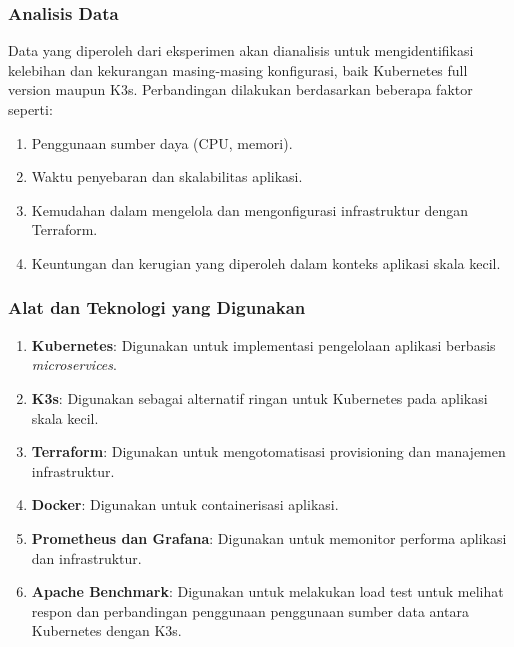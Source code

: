 \subsubsection{Analisis Data}
Data yang diperoleh dari eksperimen akan dianalisis untuk mengidentifikasi kelebihan dan kekurangan masing-masing konfigurasi, baik Kubernetes full version maupun K3s. Perbandingan dilakukan berdasarkan beberapa faktor seperti:
\begin{enumerate}
    \renewcommand{\labelenumi}{\arabic{enumi})}  
    \item Penggunaan sumber daya (CPU, memori).
    \item Waktu penyebaran dan skalabilitas aplikasi.
    \item Kemudahan dalam mengelola dan mengonfigurasi infrastruktur dengan Terraform.
    \item Keuntungan dan kerugian yang diperoleh dalam konteks aplikasi skala kecil.
\end{enumerate}

\subsubsection{Alat dan Teknologi yang Digunakan}
\begin{enumerate}
    \renewcommand{\labelenumi}{\arabic{enumi})}  
    \item \textbf{Kubernetes}: Digunakan untuk implementasi pengelolaan aplikasi berbasis \textit{microservices}.
    \item \textbf{K3s}: Digunakan sebagai alternatif ringan untuk Kubernetes pada aplikasi skala kecil.
    \item \textbf{Terraform}: Digunakan untuk mengotomatisasi provisioning dan manajemen infrastruktur.
    \item \textbf{Docker}: Digunakan untuk containerisasi aplikasi.
    \item \textbf{Prometheus dan Grafana}: Digunakan untuk memonitor performa aplikasi dan infrastruktur.
    \item \textbf{Apache Benchmark}: Digunakan untuk melakukan load test untuk melihat respon dan perbandingan penggunaan penggunaan sumber data antara Kubernetes dengan K3s.
\end{enumerate}